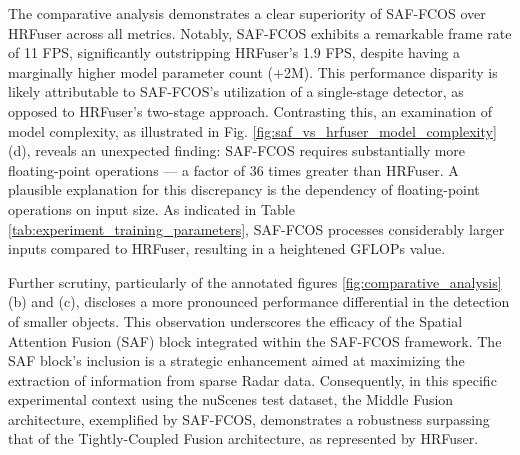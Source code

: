 \documentclass[report.tex]{subfiles}
\begin{document}


    The comparative analysis demonstrates a clear superiority of SAF-FCOS over HRFuser across all metrics. Notably, SAF-FCOS exhibits a remarkable frame rate of 11 FPS, significantly outstripping HRFuser's 1.9 FPS, despite having a marginally higher model parameter count (+2M). This performance disparity is likely attributable to SAF-FCOS's utilization of a single-stage detector, as opposed to HRFuser's two-stage approach. Contrasting this, an examination of model complexity, as illustrated in Fig. \ref{fig:saf_vs_hrfuser_model_complexity} (d), reveals an unexpected finding: SAF-FCOS requires substantially more floating-point operations — a factor of 36 times greater than HRFuser. A plausible explanation for this discrepancy is the dependency of floating-point operations on input size. As indicated in Table \ref{tab:experiment_training_parameters}, SAF-FCOS processes considerably larger inputs compared to HRFuser, resulting in a heightened GFLOPs value.

    Further scrutiny, particularly of the annotated figures \ref{fig:comparative_analysis} (b) and (c), discloses a more pronounced performance differential in the detection of smaller objects. This observation underscores the efficacy of the Spatial Attention Fusion (SAF) block integrated within the SAF-FCOS framework. The SAF block's inclusion is a strategic enhancement aimed at maximizing the extraction of information from sparse Radar data. Consequently, in this specific experimental context using the nuScenes test dataset, the Middle Fusion architecture, exemplified by SAF-FCOS, demonstrates a robustness surpassing that of the Tightly-Coupled Fusion architecture, as represented by HRFuser.
\end{document}
